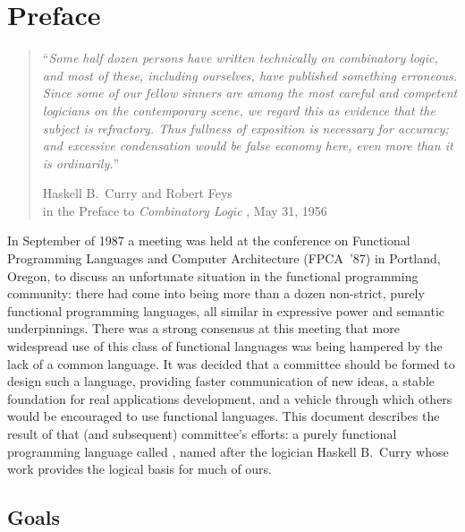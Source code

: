 
\chapter*{Preface}

\vspace{.2in}

\begin{quote}
``{\em Some half dozen persons have written technically on combinatory
logic, and most of these, including ourselves, have published
something erroneous.  Since some of our fellow sinners are among the
most careful and competent logicians on the contemporary scene, we
regard this as evidence that the subject is refractory.  Thus fullness
of exposition is necessary for accuracy; and excessive condensation
would be false economy here, even more than it is ordinarily.}''
\begin{flushright}
Haskell B.~Curry and Robert Feys \\
in the Preface to {\em Combinatory Logic} \cite{curry&feys:book}, May 31, 1956
\end{flushright}
\end{quote}

\vspace{.2in}

\noindent
In September of 1987 a meeting was held at the conference on
Functional Programming
Languages and Computer Architecture (FPCA~'87) in
Portland, Oregon, to discuss an unfortunate situation
in the functional programming community: there had come into being
more than a dozen non-strict, purely functional programming languages,
all similar in expressive power and semantic underpinnings.  There
was a strong consensus at this meeting that more widespread use of
this class of functional languages was
being hampered by the lack of a common language.  It was decided
that a committee should be formed to design such a language, providing
faster communication of new ideas, a stable foundation for real
applications development, and a vehicle through which others
would be encouraged to use functional languages.  This
document describes the result of that (and subsequent)
committee's efforts: a purely
functional programming language called \Haskell{},
named after the logician Haskell B.~Curry
whose work provides the logical basis for much of ours.

\section*{Goals}

